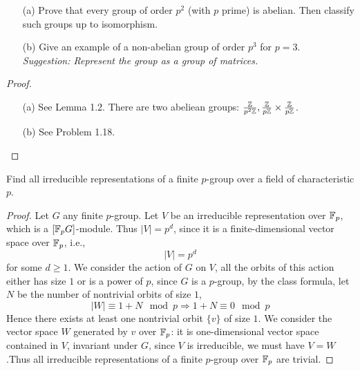 \begin{prob}[F2014-Q5]
    \phantom{text}
    \begin{enumerate}
        \item[(a)] Prove that every group of order \( p^2 \) (with \( p \) prime) is abelian. Then classify such groups up to isomorphism.
    
        \item[(b)] Give an example of a non-abelian group of order \( p^3 \) for \( p = 3 \). \\
        \emph{Suggestion: Represent the group as a group of matrices.}
    \end{enumerate}    
\end{prob}
\begin{proof}
    \begin{itemize}
        \item[(a)] See Lemma 1.2. There are two abeliean groups: $\frac{\mathbb{Z}}{p^2\mathbb{Z}}, \frac{\mathbb{Z}}{p\mathbb{Z}}\times\frac{\mathbb{Z}}{p\mathbb{Z}}$.
        \item[(b)] See Problem 1.18.
    \end{itemize}
\end{proof}

\begin{prob}[F2019-Q4, S2015-Q3]
    Find all irreducible representations of a finite $p$-group over a field of characteristic $p$.
\end{prob}
\begin{proof}
    Let $G$ any finite $p$-group. Let $V$ be an irreducible representation over $\mathbb{F}_p$, which is a $[\mathbb{F}_pG]$-module. Thus $|V|=p^d$, since it is a finite-dimensional vector space over $\mathbb{F}_p$, i.e., 
    \begin{equation*}
        |V|=p^d
    \end{equation*}
    for some $d\geq 1$. We consider the action of $G$ on $V$, all the orbits of this action either has size $1$ or is a power of $p$, since $G$ is a $p$-group, by the class formula, let $N$ be the number of nontrivial orbits of size $1$, 
    \begin{equation*}
        |W|\equiv 1+N\mod p\Rightarrow 1+N\equiv 0\mod p
    \end{equation*}
    Hence there exists at least one nontrivial orbit $\{v\}$ of size $1$. We consider the vector space $W$ generated by $v$ over $\mathbb{F}_p$: it is one-dimensional vector space contained in $V$, invariant under $G$, since $V$ is irreducible, we must have $V=W$.Thus all irreducible representations of a finite $p$-group over $\mathbb{F}_p$ are trivial.
\end{proof}


